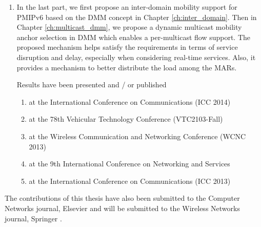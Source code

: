 \begin{enumerate}
\item In the last part, we first propose an inter-domain mobility support for PMIPv6 based on the DMM concept in Chapter \ref{ch:inter_domain}. Then in Chapter \ref{ch:multicast_dmm}, we propose a dynamic multicast mobility anchor selection in DMM which enables a per-multicast flow support. The proposed mechanism helps satisfy the requirements in terms of service disruption and delay, especially when considering real-time services. Also, it provides a mechanism to better distribute the load among the MARs. 

Results have been presented and / or published
\begin{enumerate}
\item at the International Conference on Communications (ICC 2014) \cite{Thinh_ICC}
\item at the 78th Vehicular Technology Conference (VTC2103-Fall) \cite{Thinh_VTC}
\item at the Wireless Communication and Networking Conference (WCNC 2013) \cite{Thinh_WCNC_DMM}
\item at the 9th International Conference on Networking and Services \cite{Thinh_ICNS}
\item at the International Conference on Communications (ICC 2013) \cite{ICC_Sergio}
\end{enumerate}
\end{enumerate}

The contributions of this thesis have also been submitted to the Computer Networks journal, Elsevier \cite{Thinh_elsevier_LB} and will be submitted to the Wireless Networks journal, Springer \cite{Thinh_Springer}.




